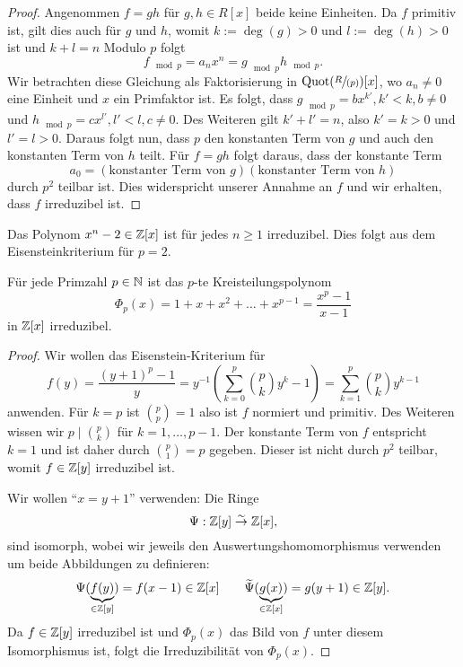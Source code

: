 \begin{proof}
	Angenommen $f = gh$ für $g,h \in R[x]$ beide keine Einheiten.
	Da $f$ primitiv ist, gilt dies auch für $g$ und $h$, womit $k := \deg(g) > 0$ und $l := \deg(h) > 0$ ist und $k+l = n$
	Modulo $p$ folgt
	\[
	f_{\mod p} = a_{n} x^{n} = g_{\mod p} h_{\mod p}
	.\] 
	Wir betrachten diese Gleichung als Faktorisierung in $\operatorname{Quot}(\sfrac{R}{(p)})[x]$, wo $a_{n} \neq 0$ eine Einheit und $x$ ein Primfaktor ist.
	Es folgt, dass $g_{\mod p} = b x^{k'}, k' < k, b \neq 0$ und $h_{\mod p} = c x^{l'}, l' < l, c \neq 0$.
	Des Weiteren gilt $k' + l' = n$, also $k' = k > 0$ und $l' = l > 0$.
	Daraus folgt nun, dass $p$ den konstanten Term von $g$ und auch den konstanten Term von $h$ teilt.
	Für $f = g h$ folgt daraus, dass der konstante Term 
	\[
		a_0 = (\text{konstanter Term von } g)(\text{konstanter Term von } h)
	\]
	durch $p^2$ teilbar ist. Dies widerspricht unserer Annahme an $f$ und wir erhalten, dass $f$ irreduzibel ist.
\end{proof}

\begin{eg}
	Das Polynom $x^{n} - 2 \in \mathbb{Z}[x]$ ist für jedes $n \geq 1$ irreduzibel.
	Dies folgt aus dem Eisensteinkriterium für $p = 2$.
\end{eg}

\begin{corollary}
	Für jede Primzahl $p \in \mathbb{N}$ ist das $p$-te Kreisteilungspolynom
	\[
		\Phi_{p}(x) = 1 + x+ x^2 + \ldots + x^{p-1} = \frac{x^{p} -1}{x-1}
	\] 
	in $\mathbb{Z}[x]$ irreduzibel.
\end{corollary}

\begin{proof}
	Wir wollen das Eisenstein-Kriterium für
	\[f(y) = \frac{(y+1)^{p}-1}{y} = y^{-1} \left(\sum_{k=0}^{p} \binom{p}{k} y^{k}-1 \right) = \sum_{k=1}^{p} \binom{p}{k} y^{k-1}
	\]
	anwenden. Für $k = p$ ist $\binom{p}{p} = 1$ also ist $f$ normiert und primitiv.
	Des Weiteren wissen wir $p \mid \binom{p}{k}$ für $k= 1,\ldots,p-1$.
	Der konstante Term von $f$ entspricht $k=1$ und ist daher durch $\binom{p}{1} = p$ gegeben.
	Dieser ist nicht durch $p^2$ teilbar, womit $f \in \mathbb{Z}[y]$ irreduzibel ist.

	Wir wollen  \enquote{$x=y+1$} verwenden: Die Ringe
	\[
		\Psi: \mathbb{Z}[y] \stackrel{\sim}{\rightarrow} \mathbb{Z}[x]
	,\] 
	sind isomorph, wobei wir jeweils den Auswertungshomomorphismus verwenden um beide Abbildungen zu definieren:
	\[
		\Psi(\underbrace{f(y)}_{\in \mathbb{Z}[y]}) = f(x-1) \in \mathbb{Z}[x] \qquad \widetilde{\Psi}(\underbrace{g(x)}_{\in \mathbb{Z}[x]}) = g(y+1) \in \mathbb{Z}[y]
	.\]
	Da $f \in \mathbb{Z}[y]$  irreduzibel ist und $\Phi_{p}(x)$ das Bild von $f$ unter diesem Isomorphismus ist, folgt die Irreduzibilität von $\Phi_{p}(x)$.
\end{proof}

